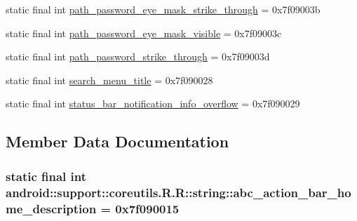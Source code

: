 \begin{CompactItemize}
\item 
static final int \hyperlink{classandroid_1_1support_1_1coreutils_1_1_r_1_1string_f75adad734aa9f80f14e1d553ce68eba}{path\_\-password\_\-eye\_\-mask\_\-strike\_\-through} = 0x7f09003b
\item 
static final int \hyperlink{classandroid_1_1support_1_1coreutils_1_1_r_1_1string_55b4fc109f749aa7fc6ede655e1b51db}{path\_\-password\_\-eye\_\-mask\_\-visible} = 0x7f09003c
\item 
static final int \hyperlink{classandroid_1_1support_1_1coreutils_1_1_r_1_1string_5da6aeba434596950db2039b70777a41}{path\_\-password\_\-strike\_\-through} = 0x7f09003d
\item 
static final int \hyperlink{classandroid_1_1support_1_1coreutils_1_1_r_1_1string_a66711e2780d42b2b19426da42d8ea41}{search\_\-menu\_\-title} = 0x7f090028
\item 
static final int \hyperlink{classandroid_1_1support_1_1coreutils_1_1_r_1_1string_d106ebc4a4ef2c3571be8e2e3d5cba9a}{status\_\-bar\_\-notification\_\-info\_\-overflow} = 0x7f090029
\end{CompactItemize}


\subsection{Member Data Documentation}
\hypertarget{classandroid_1_1support_1_1coreutils_1_1_r_1_1string_2f52bdadca8a15d75186a9d762f35e2c}{
\subsubsection[{abc\_\-action\_\-bar\_\-home\_\-description}]{\setlength{\rightskip}{0pt plus 5cm}static final int android::support::coreutils.R.R::string::abc\_\-action\_\-bar\_\-home\_\-description = 0x7f090015}}
\label{classandroid_1_1support_1_1coreutils_1_1_r_1_1string_2f52bdadca8a15d75186a9d762f35e2c}


